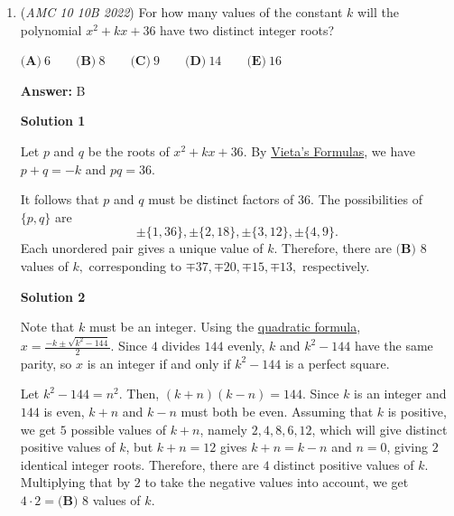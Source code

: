 \begin{enumerate}
 



\textbf{Solution 4 (Educated Guess)}

Note that $121$ is divisible by $11$ and $11211$ is divisible by $3$. Because this is Problem 6 of the AMC 10 or Problem 3 on the AMC 12, we assume we do not need to check two-digit prime divisibility or use obscure theorems. Therefore, the answer is $\boxed{\textbf{(A) } 0}.$

 Note: This is an assumption and not a suggested solution. However, it could be useful as a last resort.

 


	\item (\textit{AMC 10 10B 2022}) For how many values of the constant $k$ will the polynomial $x^{2}+kx+36$ have two distinct integer roots?


 $\textbf{(A)}\ 6 \qquad\textbf{(B)}\ 8 \qquad\textbf{(C)}\ 9 \qquad\textbf{(D)}\ 14 \qquad\textbf{(E)}\ 16$

 \textbf{Answer: }B



\textbf{Solution 1}

Let $p$ and $q$ be the roots of $x^{2}+kx+36.$ By \href{https://artofproblemsolving.com/wiki/index.php?title=Vieta\%27s\_Formulas}{Vieta's Formulas}, we have $p+q=-k$ and $pq=36.$

 It follows that $p$ and $q$ must be distinct factors of $36.$ The possibilities of $\{p,q\}$ are 
 \[\pm\{1,36\},\pm\{2,18\},\pm\{3,12\},\pm\{4,9\}.\]Each unordered pair gives a unique value of $k.$ Therefore, there are $\boxed{\textbf{(B) }8}$ values of $k,$ corresponding to $\mp37,\mp20,\mp15,\mp13,$ respectively.

 



\textbf{Solution 2}

Note that $k$ must be an integer. Using the \href{https://artofproblemsolving.com/wiki/index.php?title=Quadratic\_formula}{quadratic formula}, $x=\frac{-k \pm \sqrt{k^2-144}}{2}.$ Since $4$ divides $144$ evenly, $k$ and $k^2-144$ have the same parity, so $x$ is an integer if and only if $k^2-144$ is a perfect square.

 Let $k^2-144=n^2.$ Then, $(k+n)(k-n)=144.$ Since $k$ is an integer and $144$ is even, $k+n$ and $k-n$ must both be even. Assuming that $k$ is positive, we get $5$ possible values of $k+n$, namely $2, 4, 8, 6, 12$, which will give distinct positive values of $k$, but $k+n=12$ gives $k+n=k-n$ and $n=0$, giving $2$ identical integer roots. Therefore, there are $4$ distinct positive values of $k.$ Multiplying that by $2$ to take the negative values into account, we get $4\cdot2=\boxed{\textbf{(B) }8}$ values of $k$.


\end{enumerate}
